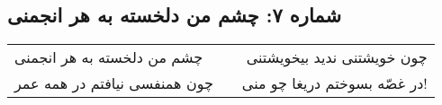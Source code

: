 \begin{center}
\section*{شماره ۷: چشم من دلخسته به هر انجمنی}
\label{sec:007}
\begin{longtable}{l p{0.5cm} r}
چشم من دلخسته به هر انجمنی
&&
چون خویشتنی ندید بیخویشتنی
\\
چون همنفسی نیافتم در همه عمر
&&
در غصّه بسوختم دریغا چو منی!
\\
\end{longtable}
\end{center}
